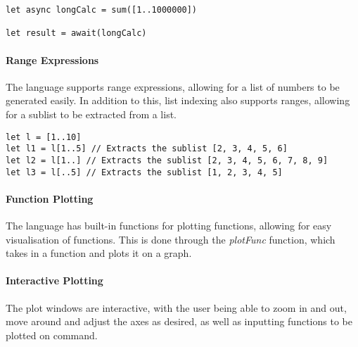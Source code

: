\begin{verbatim}
let async longCalc = sum([1..1000000])

let result = await(longCalc)
\end{verbatim}

\paragraph{Range Expressions} The language supports range expressions, allowing for a list of numbers to be
generated easily.
In addition to this, list indexing also supports ranges, allowing for a sublist to be extracted from a list.

\begin{verbatim}
let l = [1..10]
let l1 = l[1..5] // Extracts the sublist [2, 3, 4, 5, 6]
let l2 = l[1..] // Extracts the sublist [2, 3, 4, 5, 6, 7, 8, 9]
let l3 = l[..5] // Extracts the sublist [1, 2, 3, 4, 5]
\end{verbatim}

\paragraph{Function Plotting} The language has built-in functions for plotting functions, allowing for easy
visualisation of functions.
This is done through the \textit{plotFunc} function, which takes in a function and plots it on a graph.

\paragraph{Interactive Plotting} The plot windows are interactive, with the user being able to zoom in and out,
move around and adjust the axes as desired, as well as inputting functions to be plotted on command.